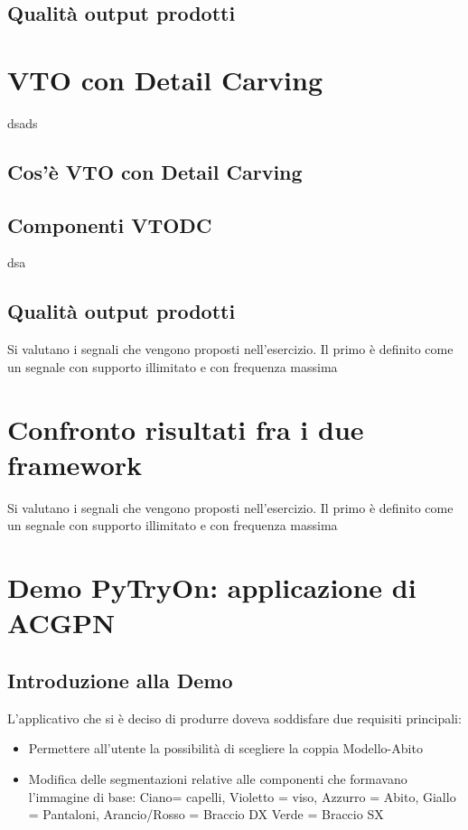 \documentclass[final, 11pt]{article}
\begin{document}
	\subsection{Qualità output prodotti}
	\section{VTO con Detail Carving}
	dsads
	\subsection{Cos'è VTO con Detail Carving}
	\subsection{Componenti VTODC}
	dsa
	\subsection{Qualità output prodotti}
	Si valutano i segnali che vengono proposti nell'esercizio. Il primo è definito come un segnale con supporto illimitato e con frequenza massima 
	
	\newpage
	\section{Confronto risultati fra i due framework}	
	Si valutano i segnali che vengono proposti nell'esercizio. Il primo è definito come un segnale con supporto illimitato e con frequenza massima 
	
	\newpage
	\section{Demo PyTryOn: applicazione di ACGPN}
	\subsection{Introduzione alla Demo}
	L’applicativo che si è deciso di produrre doveva soddisfare due requisiti principali:
	\begin{itemize}
		\item Permettere all’utente la possibilità di scegliere la coppia Modello-Abito
		\item Modifica delle segmentazioni relative alle componenti che formavano l’immagine di base:
		Ciano= capelli, Violetto = viso, Azzurro = Abito, Giallo = Pantaloni, Arancio/Rosso = Braccio DX
		Verde = Braccio SX
	\end{itemize}
\end{document}
